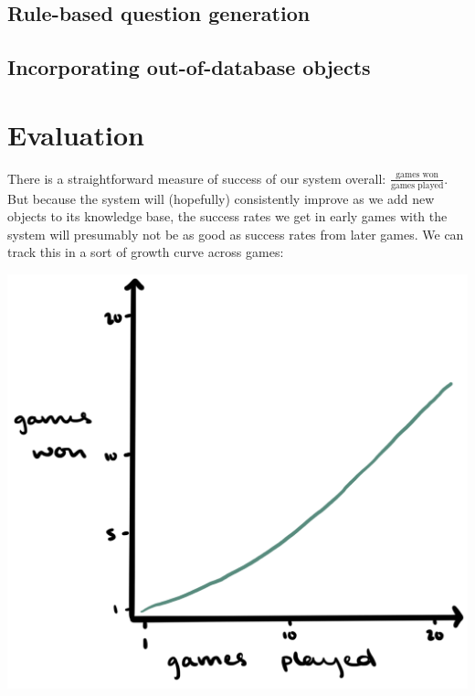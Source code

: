 \documentclass[11pt,a4paper]{article}
\begin{document}
\subsection{Rule-based question generation}

\lipsum[1]


\subsection{Incorporating out-of-database objects}

\lipsum[1]


\section{Evaluation}

There is a straightforward measure of success of our system overall: $\frac{\text{games won}}{\text{games played}}$.
But because the system will (hopefully) consistently improve as we add new objects to its knowledge base, the success rates we get in early games with the system will presumably not be as good as success rates from later games. 
We can track this in a sort of growth curve across games:

\begin{center}
	\includegraphics[width=.5\linewidth]{growth-curve.png}
\end{center}
\end{document}
